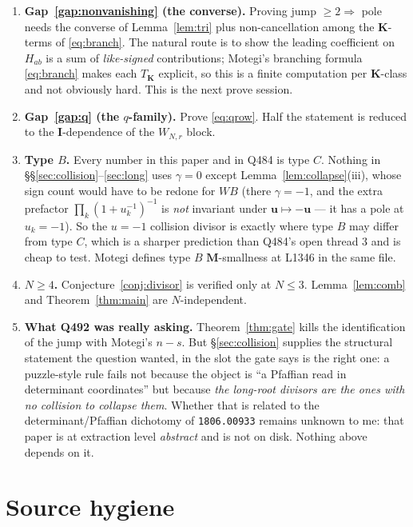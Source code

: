 \documentclass[11pt]{article}
\theoremstyle{plain}
\theoremstyle{definition}
\theoremstyle{remark}
\theoremstyle{plain}
\newcommand{\bI}{\mathbf{I}}
\newcommand{\bM}{\mathbf{M}}
\newcommand{\bK}{\mathbf{K}}
\newcommand{\bu}{\mathbf{u}}
\begin{document}
\begin{enumerate}
\item \textbf{Gap~\ref{gap:nonvanishing} (the converse).}  Proving
jump $\ge2\Rightarrow$ pole needs the converse of Lemma~\ref{lem:tri} plus
non-cancellation among the $\bK$-terms of \eqref{eq:branch}.  The natural route
is to show the leading coefficient on $H_{ab}$ is a sum of \emph{like-signed}
contributions; Motegi's branching formula \eqref{eq:branch} makes each
$T_{\bK}$ explicit, so this is a finite computation per $\bK$-class and not
obviously hard.  This is the next prove session.

\item \textbf{Gap~\ref{gap:q} (the $q$-family).}  Prove \eqref{eq:qrow}.  Half
the statement is reduced to the $\bI$-dependence of the $W_{N,r}$ block.

\item \textbf{Type $B$.}  Every number in this paper and in Q484 is type $C$.
Nothing in \S\S\ref{sec:collision}--\ref{sec:long} uses $\gamma=0$ except
Lemma~\ref{lem:collapse}(iii), whose sign count would have to be redone for
$WB$ (there $\gamma=-1$, and the extra prefactor
$\prod_k(1+u_k^{-1})^{-1}$ is \emph{not} invariant under
$\bu\mapsto-\bu$ --- it has a pole at $u_k=-1$).  So the $u=-1$ collision
divisor is exactly where type $B$ may differ from type $C$, which is a sharper
prediction than Q484's open thread 3 and is cheap to test.  Motegi defines
type $B$ $\bM$-smallness at L1346 in the same file.

\item \textbf{$N\ge4$.}  Conjecture~\ref{conj:divisor} is verified only at
$N\le3$.  Lemma~\ref{lem:comb} and Theorem~\ref{thm:main} are $N$-independent.

\item \textbf{What Q492 was really asking.}  Theorem~\ref{thm:gate} kills the
identification of the jump with Motegi's $n-s$.  But \S\ref{sec:collision}
supplies the structural statement the question wanted, in the slot the gate
says is the right one: a puzzle-style rule fails not because the object is ``a
Pfaffian read in determinant coordinates'' but because \emph{the long-root
divisors are the ones with no collision to collapse them}.  Whether that is
related to the determinant/Pfaffian dichotomy of \texttt{1806.00933} remains
unknown to me: that paper is at extraction level \emph{abstract} and is not on
disk.  Nothing above depends on it.
\end{enumerate}

\section*{Source hygiene}
\end{document}
